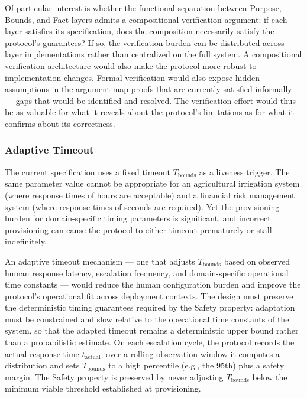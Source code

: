 Of particular interest is whether the functional separation between Purpose, Bounds, and Fact layers admits a compositional verification argument: if each layer satisfies its specification, does the composition necessarily satisfy the protocol's guarantees? If so, the verification burden can be distributed across layer implementations rather than centralized on the full system. A compositional verification architecture would also make the protocol more robust to implementation changes. Formal verification would also expose hidden assumptions in the argument-map proofs that are currently satisfied informally --- gaps that would be identified and resolved. The verification effort would thus be as valuable for what it reveals about the protocol's limitations as for what it confirms about its correctness.

\subsubsection{Adaptive Timeout}

The current specification uses a fixed timeout $T_{\text{bounds}}$ as a liveness trigger. The same parameter value cannot be appropriate for an agricultural irrigation system (where response times of hours are acceptable) and a financial risk management system (where response times of seconds are required). Yet the provisioning burden for domain-specific timing parameters is significant, and incorrect provisioning can cause the protocol to either timeout prematurely or stall indefinitely.

An adaptive timeout mechanism --- one that adjusts $T_{\text{bounds}}$ based on observed human response latency, escalation frequency, and domain-specific operational time constants --- would reduce the human configuration burden and improve the protocol's operational fit across deployment contexts. The design must preserve the deterministic timing guarantees required by the Safety property: adaptation must be constrained and slow relative to the operational time constants of the system, so that the adapted timeout remains a deterministic upper bound rather than a probabilistic estimate. On each escalation cycle, the protocol records the actual response time $t_{\text{actual}}$; over a rolling observation window it computes a distribution and sets $T_{\text{bounds}}$ to a high percentile (e.g., the 95th) plus a safety margin. The Safety property is preserved by never adjusting $T_{\text{bounds}}$ below the minimum viable threshold established at provisioning.

